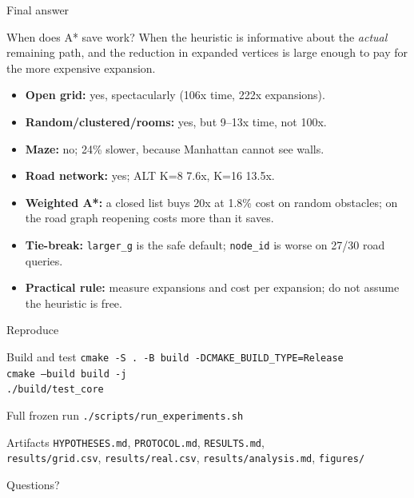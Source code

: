 \documentclass[aspectratio=169,10pt]{beamer}
\begin{document}
\begin{frame}{Final answer}
  \begin{block}{When does A* save work?}
    When the heuristic is informative about the \emph{actual} remaining path,
    and the reduction in expanded vertices is large enough to pay for the
    more expensive expansion.
  \end{block}
  \begin{itemize}
    \item \textbf{Open grid:} yes, spectacularly (106x time, 222x expansions).
    \item \textbf{Random/clustered/rooms:} yes, but 9--13x time, not 100x.
    \item \textbf{Maze:} no; 24\% slower, because Manhattan cannot see walls.
    \item \textbf{Road network:} yes; ALT K=8 7.6x, K=16 13.5x.
    \item \textbf{Weighted A*:} a closed list buys 20x at 1.8\% cost on random
      obstacles; on the road graph reopening costs more than it saves.
    \item \textbf{Tie-break:} \texttt{larger\_g} is the safe default;
      \texttt{node\_id} is worse on 27/30 road queries.
    \item \textbf{Practical rule:} measure expansions and cost per expansion;
      do not assume the heuristic is free.
  \end{itemize}
\end{frame}

\begin{frame}{Reproduce}
  \small
  \begin{block}{Build and test}
    \texttt{cmake -S . -B build -DCMAKE\_BUILD\_TYPE=Release}\\
    \texttt{cmake --build build -j}\\
    \texttt{./build/test\_core}
  \end{block}
  \begin{block}{Full frozen run}
    \texttt{./scripts/run\_experiments.sh}
  \end{block}
  \begin{block}{Artifacts}
    \texttt{HYPOTHESES.md}, \texttt{PROTOCOL.md}, \texttt{RESULTS.md},\\
    \texttt{results/grid.csv}, \texttt{results/real.csv},
    \texttt{results/analysis.md}, \texttt{figures/}
  \end{block}
  \vspace{0.6em}
  \centering
  \Large Questions?
\end{frame}
\end{document}
